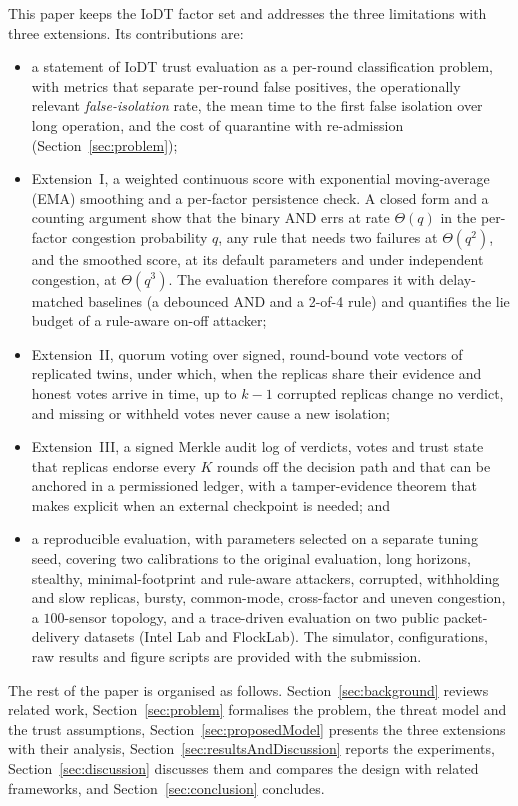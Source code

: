 This paper keeps the IoDT factor set and addresses the three
limitations with three extensions.  Its contributions are:
\begin{itemize}
\item a statement of IoDT trust evaluation as a per-round
classification problem, with metrics that separate per-round false
positives, the operationally relevant \emph{false-isolation} rate,
the mean time to the first false isolation over long operation, and
the cost of quarantine with re-admission (Section~\ref{sec:problem});
\item Extension~I, a weighted continuous score with exponential
moving-average (EMA) smoothing and a per-factor persistence check.
A closed form and a counting argument show that the binary AND errs at
rate $\Theta(q)$ in the per-factor congestion probability $q$, any
rule that needs two failures at $\Theta(q^{2})$, and the smoothed
score, at its default parameters and under independent congestion, at
$\Theta(q^{3})$.  The evaluation therefore compares it with
delay-matched baselines (a debounced AND and a 2-of-4 rule) and
quantifies the lie budget of a rule-aware on-off attacker;
\item Extension~II, quorum voting over signed, round-bound vote
vectors of replicated twins, under which, when the replicas share
their evidence and honest votes arrive in time, up to $k-1$ corrupted
replicas change no verdict, and missing or withheld votes never cause
a new isolation;
\item Extension~III, a signed Merkle audit log of verdicts, votes and
trust state that replicas endorse every $K$ rounds off the decision
path and that can be anchored in a permissioned ledger, with a
tamper-evidence theorem that makes explicit when an external
checkpoint is needed; and
\item a reproducible evaluation, with parameters selected on a
separate tuning seed, covering two calibrations to the original
evaluation, long horizons, stealthy, minimal-footprint and rule-aware
attackers, corrupted, withholding and slow replicas, bursty,
common-mode, cross-factor and uneven congestion, a $100$-sensor
topology, and a trace-driven evaluation on two public packet-delivery
datasets (Intel Lab and FlockLab).  The simulator, configurations, raw results and figure
scripts are provided with the submission.
\end{itemize}

The rest of the paper is organised as follows.
Section~\ref{sec:background} reviews related work,
Section~\ref{sec:problem} formalises the problem, the threat model and
the trust assumptions, Section~\ref{sec:proposedModel} presents the
three extensions with their analysis, Section~\ref{sec:resultsAndDiscussion}
reports the experiments, Section~\ref{sec:discussion} discusses them
and compares the design with related frameworks, and
Section~\ref{sec:conclusion} concludes.


